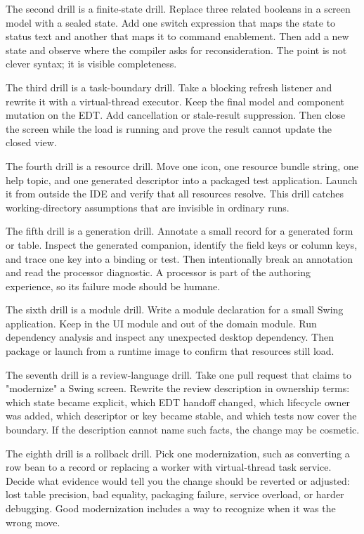 The second drill is a finite-state drill. Replace three related booleans in a screen model with a sealed state. Add one switch expression that maps the state to status text and another that maps it to command enablement. Then add a new state and observe where the compiler asks for reconsideration. The point is not clever syntax; it is visible completeness.

The third drill is a task-boundary drill. Take a blocking refresh listener and rewrite it with a virtual-thread executor. Keep the final model and component mutation on the EDT. Add cancellation or stale-result suppression. Then close the screen while the load is running and prove the result cannot update the closed view.

The fourth drill is a resource drill. Move one icon, one resource bundle string, one help topic, and one generated descriptor into a packaged test application. Launch it from outside the IDE and verify that all resources resolve. This drill catches working-directory assumptions that are invisible in ordinary runs.

The fifth drill is a generation drill. Annotate a small record for a generated form or table. Inspect the generated companion, identify the field keys or column keys, and trace one key into a binding or test. Then intentionally break an annotation and read the processor diagnostic. A processor is part of the authoring experience, so its failure mode should be humane.

The sixth drill is a module drill. Write a module declaration for a small Swing application. Keep  in the UI module and out of the domain module. Run dependency analysis and inspect any unexpected desktop dependency. Then package or launch from a runtime image to confirm that resources still load.

The seventh drill is a review-language drill. Take one pull request that claims to "modernize" a Swing screen. Rewrite the review description in ownership terms: which state became explicit, which EDT handoff changed, which lifecycle owner was added, which descriptor or key became stable, and which tests now cover the boundary. If the description cannot name such facts, the change may be cosmetic.

The eighth drill is a rollback drill. Pick one modernization, such as converting a row bean to a record or replacing a worker with virtual-thread task service. Decide what evidence would tell you the change should be reverted or adjusted: lost table precision, bad equality, packaging failure, service overload, or harder debugging. Good modernization includes a way to recognize when it was the wrong move.

